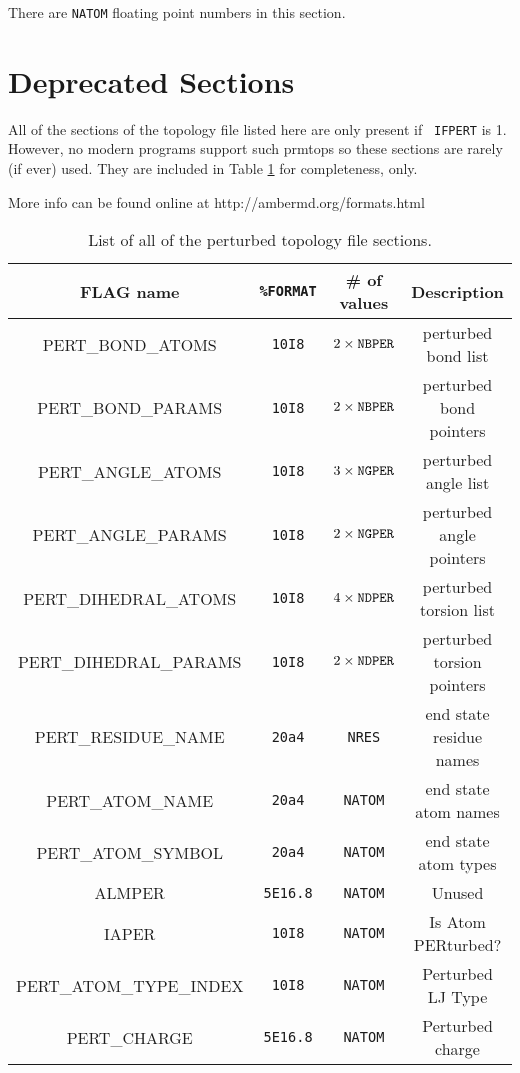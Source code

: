 \noindent There are {\tt NATOM} floating point numbers in this section.


\section{Deprecated Sections}

All of the sections of the topology file listed here are only present if {\tt
IFPERT} is 1. However, no modern programs support such prmtops so these sections
are rarely (if ever) used. They are included in Table \ref{tblB:PertSections}
for completeness, only.

More info can be found online at http://ambermd.org/formats.html

\begin{table}
   \caption{List of all of the perturbed topology file sections.}
   \begin{tabular}{cccc}
      \hline
      FLAG name & {\tt \%FORMAT} & # of values & Description \\
      \hline
      PERT\_BOND\_ATOMS & {\tt 10I8} &  $2 \times {\tt NBPER}$ & perturbed bond
         list \\
      PERT\_BOND\_PARAMS & {\tt 10I8} & $2 \times {\tt NBPER}$ & perturbed bond
         pointers \\
      PERT\_ANGLE\_ATOMS & {\tt 10I8} & $3 \times {\tt NGPER}$ & perturbed angle
         list \\
      PERT\_ANGLE\_PARAMS & {\tt 10I8} & $2 \times {\tt NGPER}$ & perturbed
         angle pointers \\
      PERT\_DIHEDRAL\_ATOMS & {\tt 10I8} & $4 \times {\tt NDPER}$ & perturbed
         torsion list \\
      PERT\_DIHEDRAL\_PARAMS & {\tt 10I8} & $2 \times {\tt NDPER}$ & perturbed
         torsion pointers \\
      PERT\_RESIDUE\_NAME & {\tt 20a4} & {\tt NRES} & end state residue names \\
      PERT\_ATOM\_NAME & {\tt 20a4} & {\tt NATOM} & end state atom names \\
      PERT\_ATOM\_SYMBOL & {\tt 20a4} & {\tt NATOM} & end state atom types \\
      ALMPER & {\tt 5E16.8} & {\tt NATOM} & Unused \\
      IAPER & {\tt 10I8} & {\tt NATOM} & Is Atom PERturbed? \\
      PERT\_ATOM\_TYPE\_INDEX & {\tt 10I8} & {\tt NATOM} &
         Perturbed LJ Type \\
      PERT\_CHARGE & {\tt 5E16.8} & {\tt NATOM} & Perturbed charge \\
      \hline
   \end{tabular}
   \label{tblB:PertSections}
\end{table}

